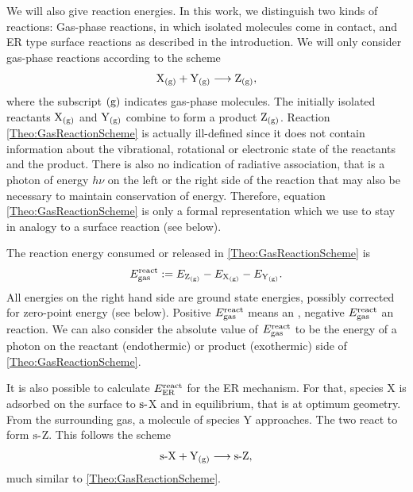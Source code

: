 \documentclass[8.5pt,twoside,twocolumn]{article}
\newcommand\ere{\enmat{E^{\te{react}}}}
\newcommand\sur{\enmat{\te{s-}}}
\newcommand\gas{\enmat{_\te{(g)}}}
\theoremstyle{standard}
\begin{document}
We will also give reaction energies. In this work, we distinguish two kinds of reactions:
Gas-phase reactions, in which isolated molecules come in contact, and
ER type %
surface reactions as described in the introduction. We will only consider
gas-phase reactions according to the scheme
\begin{equation}
 \X\gas+\Y\gas \chemar  \Z\gas,
 \label{Theo:GasReactionScheme}
\end{equation} 
where the subscript $(\text g)$ indicates gas-phase molecules. The initially
isolated reactants $\X\gas$ and $\Y\gas$ combine to form a product $\Z\gas$. 
Reaction \eqref{Theo:GasReactionScheme} is actually ill-defined since it does
not contain information about the vibrational, rotational or electronic state
of the reactants and the product. There is also no indication of
radiative association, that is a photon of energy $h\nu$ on the left or the
right side of the reaction that may also be necessary to maintain conservation
of energy. Therefore, equation \eqref{Theo:GasReactionScheme} is only a formal representation which we
use to stay in analogy to a surface reaction (see below).

The reaction energy consumed or released in \eqref{Theo:GasReactionScheme} is
\begin{equation}
 \ere_{\te{gas}}:= E_{\Z\gas} - E_{\X\gas} - E_{\Y\gas}.
 \label{Theo:ReactionEnergyGas}
\end{equation}
All energies on the right hand side are ground state energies, possibly
corrected for zero-point energy (see below). Positive
$\ere_{\te{gas}}$ means an , negative $\ere_{\te{gas}}$ an  reaction. We can also consider the absolute
value of $\ere_{\te{gas}}$ to be the energy of a photon on the reactant
(endothermic) or product (exothermic) side of \eqref{Theo:GasReactionScheme}.

It is also possible to calculate  $\ere_{\te{ER}}$ for the ER mechanism. For that,
species X is adsorbed on the surface to $\sur$X and in equilibrium, that is at optimum
geometry. From the surrounding gas, a molecule of species Y approaches. The two react
to form $\sur$Z. This follows the scheme
\begin{equation}
 \sur\X+\Y\gas \chemar  \sur\Z,
 \label{Theo:SurfaceReactionScheme}
\end{equation} 
much similar to \eqref{Theo:GasReactionScheme}. 
\end{document}
